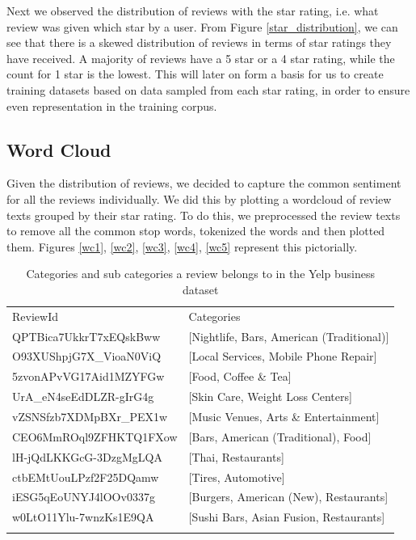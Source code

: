 \documentclass[paper=a4, fontsize=11pt]{scrartcl} %
\numberwithin{equation}{section} %
\numberwithin{figure}{section} %
\numberwithin{table}{section} %
\begin{document}
Next we observed the distribution of reviews with the star rating, i.e. what review was given which star by a user. From Figure \ref{star_distribution}, we can see that there is a skewed distribution of reviews in terms of star ratings they have received. A majority of reviews have a 5 star or a 4 star rating, while the count for 1 star is the lowest. This will later on form a basis for us to create training datasets based on data sampled from each star rating, in order to ensure even representation in the training corpus.

\subsection{Word Cloud}
Given the distribution of reviews, we decided to capture the common sentiment for all the reviews individually. We did this by plotting a wordcloud of review texts grouped by their star rating. To do this, we preprocessed the review texts to remove all the common stop  words, tokenized the words and then plotted them. Figures \ref{wc1}, \ref{wc2}, \ref{wc3}, \ref{wc4}, \ref{wc5} represent this pictorially.

\begin{table}[!htb]
 \centering
 \caption{Categories and sub categories a review belongs to in the Yelp business dataset}
 \label{review_cat_table}
 \begin{tabular}{l l} 
    \noalign{\smallskip}\hline\noalign{\smallskip}
    ReviewId & Categories \\
    \noalign{\smallskip}\hline\noalign{\smallskip}
	QPTBica7UkkrT7xEQskBww & [Nightlife, Bars, American (Traditional)] \\
O93XUShpjG7X\_VioaN0ViQ & [Local Services, Mobile Phone Repair] \\
5zvonAPvVG17Aid1MZYFGw & [Food, Coffee \& Tea] \\
UrA\_eN4seEdDLZR-gIrG4g & [Skin Care, Weight Loss Centers] \\
vZSNSfzb7XDMpBXr\_PEX1w & [Music Venues, Arts \& Entertainment] \\
CEO6MmROql9ZFHKTQ1FXow  & [Bars, American (Traditional), Food] \\
lH-jQdLKKGcG-3DzgMgLQA & [Thai, Restaurants] \\
ctbEMtUouLPzf2F25DQamw & [Tires, Automotive] \\
iESG5qEoUNYJ4lOOv0337g & [Burgers, American (New), Restaurants] \\
w0LtO11Ylu-7wnzKs1E9QA & [Sushi Bars, Asian Fusion, Restaurants] \\
    \noalign{\smallskip}\hline
  \end{tabular} 
\end{table}  
\end{document}
